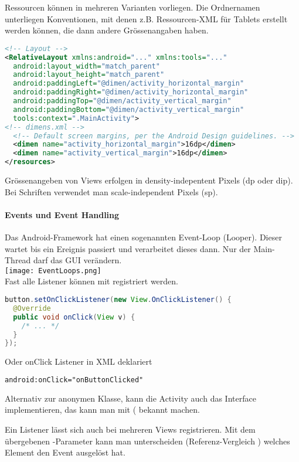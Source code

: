 Ressourcen können in mehreren Varianten vorliegen. Die Ordnernamen unterliegen Konventionen, mit denen z.B. Ressourcen-XML für Tablets erstellt werden können, die dann andere Grössenangaben haben.

\begin{lstlisting}[language=xml]
<!-- Layout -->
<RelativeLayout xmlns:android="..." xmlns:tools="..."
  android:layout_width="match_parent"
  android:layout_height="match_parent"
  android:paddingLeft="@dimen/activity_horizontal_margin"
  android:paddingRight="@dimen/activity_horizontal_margin"
  android:paddingTop="@dimen/activity_vertical_margin"
  android:paddingBottom="@dimen/activity_vertical_margin"
  tools:context=".MainActivity">
<!-- dimens.xml -->
  <!-- Default screen margins, per the Android Design guidelines. -->
  <dimen name="activity_horizontal_margin">16dp</dimen>
  <dimen name="activity_vertical_margin">16dp</dimen>
</resources>
\end{lstlisting}
Grössenangeben von Views erfolgen in density-indepentent Pixels (dp oder dip). Bei Schriften verwendet man scale-independent Pixels (sp).
\paragraph{Events und Event Handling}\label{grundlagen:eventhandling} Das Android-Framework hat einen sogenannten Event-Loop (Looper). Dieser wartet bis ein Ereignis passiert und verarbeitet dieses dann. Nur der Main-Thread darf das GUI verändern. \\
\texttt{[image: EventLoops.png]} \\
Fast alle Listener können mit  registriert werden.
\begin{lstlisting}[language=java]
button.setOnClickListener(new View.OnClickListener() {
  @Override
  public void onClick(View v) {
    /* ... */
  }
});
\end{lstlisting}
Oder onClick Listener in XML deklariert
\begin{lstlisting}[language=xml]
android:onClick="onButtonClicked"
\end{lstlisting}
Alternativ zur anonymen Klasse, kann die Activity auch das Interface implementieren, das kann man mit  ( bekannt machen.

Ein Listener lässt sich auch bei mehreren Views registrieren. Mit dem übergebenen -Parameter kann man unterscheiden (Referenz-Vergleich \code{==}) welches Element den Event ausgelöst hat.

